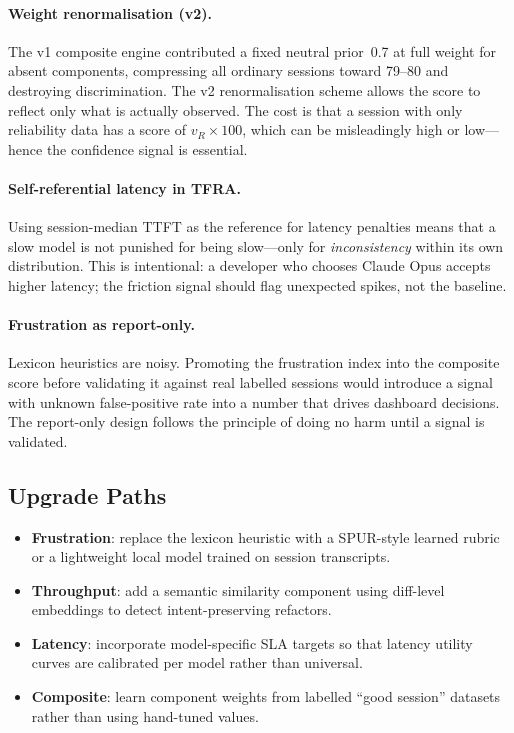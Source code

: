 \documentclass[11pt,a4paper]{article}
\begin{document}
\paragraph{Weight renormalisation (v2).}
The v1 composite engine contributed a fixed neutral prior~0.7 at full weight
for absent components, compressing all ordinary sessions toward 79--80 and
destroying discrimination.  The v2 renormalisation scheme allows the score to
reflect only what is actually observed.  The cost is that a session with only
reliability data has a score of $v_R \times 100$, which can be misleadingly
high or low---hence the confidence signal is essential.

\paragraph{Self-referential latency in TFRA.}
Using session-median TTFT as the reference for latency penalties means that a
slow model is not punished for being slow---only for \emph{inconsistency}
within its own distribution.  This is intentional: a developer who chooses
Claude Opus accepts higher latency; the friction signal should flag unexpected
spikes, not the baseline.

\paragraph{Frustration as report-only.}
Lexicon heuristics are noisy.  Promoting the frustration index into the
composite score before validating it against real labelled sessions would
introduce a signal with unknown false-positive rate into a number that drives
dashboard decisions.  The report-only design follows the principle of doing no
harm until a signal is validated.

\subsection{Upgrade Paths}

\begin{itemize}
  \item \textbf{Frustration}: replace the lexicon heuristic with a SPUR-style
        learned rubric or a lightweight local model trained on session transcripts.
  \item \textbf{Throughput}: add a semantic similarity component using
        diff-level embeddings to detect intent-preserving refactors.
  \item \textbf{Latency}: incorporate model-specific SLA targets so that
        latency utility curves are calibrated per model rather than universal.
  \item \textbf{Composite}: learn component weights from labelled ``good session''
        datasets rather than using hand-tuned values.
\end{itemize}
\end{document}
